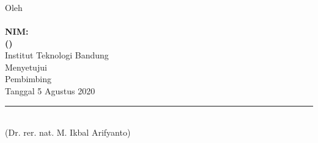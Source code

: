 \chapter*{}
\label{chp:pengesahan}
\begin{center}
  \textbf{\large
  \MakeUppercase{\titlename} }\\
  Oleh \\
  \textbf{{\large\authorname \\
    NIM: \authorid} \\
    (\department)} \\
  \vspace{\baselineskip}
  Institut Teknologi Bandung \\

  Menyetujui \\
  Pembimbing \\
  \vspace{\baselineskip}
  Tanggal 5 Agustus 2020 \\
  \rule{6cm}{1pt} \\
  (Dr. rer. nat. M. Ikbal Arifyanto)
\end{center}

\vspace{0.5cm} %

